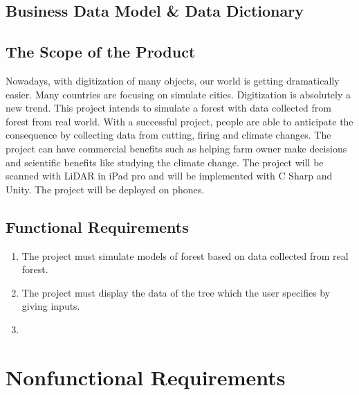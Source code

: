 \documentclass{article}
\begin{document}
\subsection{Business Data Model \& Data Dictionary}

\subsection{The Scope of the Product}
Nowadays, with digitization of many objects, our world is getting dramatically easier. Many countries are focusing on simulate cities. Digitization is absolutely a new trend. This project intends to simulate a forest with data collected from forest from real world. With a successful project, people are able to anticipate the consequence by collecting data from cutting, firing and climate changes. The project can have commercial benefits such as helping farm owner make decisions and scientific benefits like studying the climate change. The project will be scanned with LiDAR in iPad pro and will be implemented with C Sharp and Unity. The project will be deployed on phones.
\subsection{Functional Requirements}
\begin{enumerate}[FR1]
	\item The project must simulate models of forest based on data collected from real forest.
	\item The project must display the data of the tree which the user specifies by giving inputs.
	\item 
\end{enumerate}



\section{Nonfunctional Requirements}
\end{document}
